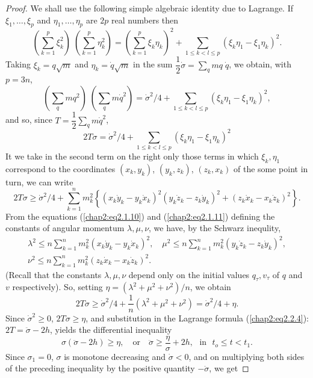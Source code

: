 \begin{proof}
We shall use the following simple algebraic identity due to Lagrange. If $\xi_1, \ldots, \xi_p$ and $\eta_1 , \ldots, \eta_p$ are $2p$ real numbers then 
$$
(\sum\limits^p_{k=1} \xi^2_k) \; (\sum\limits^p_{k=1} \eta^2_k) = (\sum\limits^p_{k=1} \xi_k \eta_k)^2  + \sum\limits_{1 \leq k < l \leq p} (\xi_k \eta_1 -\xi_1 \eta_k)^2.
$$
Taking $\xi_k = q \sqrt{m}$ and $\eta_k = \dot{q} \sqrt{m}$ in the sum $\dfrac{1}{2} \dot{\sigma} = \sum\limits_q m q \; \dot{q}$, we obtain, with $p = 3n$, 
$$
(\sum_q mq^2) \; (\sum_q m \dot{q}^2) = \dot{\sigma}^2 / 4 + \sum\limits_{1 \leq k <l \leq p} (\xi_k \eta_1 - \xi_1 \eta_k)^2,
$$
and so, since $T = \dfrac{1}{2} \sum\limits_q m \dot{q}^2$,
$$
2T\sigma =\dot{\sigma}^2/4 + \sum\limits_{1\leq k < l \leq p} (\xi_k \eta_1 - \xi_1 \eta_k)^2 
$$
It we take in the second term on the right only those terms in which $\xi_k, \eta_1$ correspond to the coordinates $(x_k , y_k)$, \; $(y_k , z_k)$, $(z_k, x_k)$ of the some point in turn, we can write
$$
 2T \sigma \geq \dot{\sigma}^2/4 + \sum\limits^n_{k=1} m^2_k \left\{ (x_k \dot{y}_k - y_k \dot{x}_k)^2  (y_k \dot{z}_k - z_k \dot{y}_k)^2 + (z_k \dot{x}_k  - x_k \dot{z}_k)^2 \right\}  .  
$$\pageoriginale
From the equations (\ref{chap2:eq2.1.10}) and (\ref{chap2:eq2.1.11}) defining the constants of angular momentum $\lambda, \mu, \nu$, we have, by the Schwarz inequlity,
\begin{gather*}
\lambda^2 \leq n \sum\limits^n_{k=1} m^2_k (x_k \dot{y}_k - y_k \dot{x}_k)^2, \quad \mu^2 \leq n \sum\limits^n_{k=1} m^2_k(y_k \dot{z}_k - z_k\dot{y}_k)^2,\\
\nu^2 \leq n \sum\limits^n_{k=1} m^2_k (z_k \dot{x}_k - x_k \dot{z}_k)^2.
\end{gather*}
(Recall that the constants $\lambda, \mu, \nu$ depend only on the initial values $q_\tau, v_\tau$ of $q$ and $v$ respectively). So, setting $\eta = (\lambda^2 + \mu^2+ \nu^2)/n$, we obtain
$$
2T\sigma \geq \dot{\sigma}^2/4 + \frac{1}{n} (\lambda^2 + \mu^2 + \nu^2) =\dot{\sigma}^2/4 + \eta. 
$$
Since $\dot{\sigma}^2 \geq 0$, $2T \sigma \geq \eta$, and substitution in the Lagrange formula (\ref{chap2:eq2.2.4}): $2T = \ddot{\sigma} - 2h$, yields the differential inequality
$$ 
\sigma (\ddot{\sigma} - 2h) \geq \eta, \quad \text{or}\quad \ddot{\sigma} \geq \frac{\eta}{\sigma} + 2h, \text{~ in ~} t_o \leq t < t_1. 
$$
Since $\sigma_1 = 0$, $\sigma$ is  monotone decreasing and $\dot{\sigma} < 0$, and on multiplying both sides of the preceding inequality by the positive quantity $-\dot{\sigma}$, we get

\end{proof}
